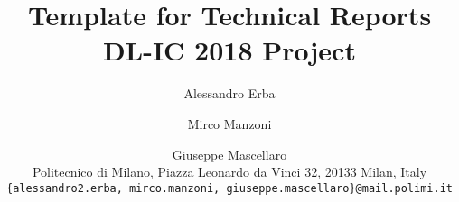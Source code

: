 \documentclass[10pt,twocolumn,letterpaper]{article}
\begin{document}
\title{Template for Technical Reports \\ DL-IC 2018 Project}

\author{
	Alessandro Erba \and Mirco Manzoni \and Giuseppe Mascellaro
	\\
	Politecnico di Milano, Piazza Leonardo da Vinci 32, 20133 Milan, Italy\\
	{\tt\small \{alessandro2.erba, mirco.manzoni, giuseppe.mascellaro\}@mail.polimi.it}
}

\maketitle








\appendix


{
\small


}
\end{document}

